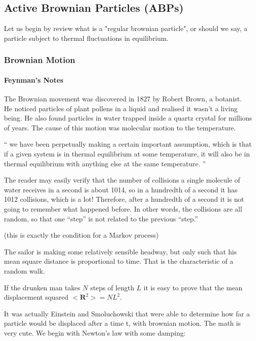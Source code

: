 \documentclass[a4paper]{article}
\begin{document}
\subsection{Active Brownian Particles (ABPs)}

Let us begin by review what is a "regular brownian particle", or should we say, a particle subject to thermal fluctuations in equilibrium.

\subsubsection{Brownian Motion}
\paragraph{Feynman's Notes} 

The Brownian movement was discovered in 1827 by Robert Brown, a botanist. He noticed particles of plant pollens in a liquid and realised it wasn't a living being. He also found particles in water trapped inside a quartz crystal for millions of years. The cause of this motion was molecular motion to the temperature.

``
we have been perpetually making a certain important assumption, which is that if a given system is in thermal equilibrium at some temperature, it will also be in thermal equilibrium with anything else at the same temperature.
''

 The reader may easily verify that the number of collisions a single molecule of water receives in a second is about 1014, so in a hundredth of a second it has 1012 collisions, which is a lot! Therefore, after a hundredth of a second it is not going to remember what happened before. In other words, the collisions are all random, so that one “step” is not related to the previous “step.”
 
 (this is exactly the condition for a Markov process)

The sailor is making some relatively sensible headway, but only such that his mean square distance is proportional to time. That is the characteristic of a random walk.
 
If the drunken man takes $N$ steps of length $L$ it is easy to prove that the mean displacement squared
$<\mathbf{R}^2> = NL^2$.

It was actually Einstein and Smoluchowski that were able to determine how far a particle would be displaced after a time t, with brownian motion. The math is very cute. We begin with Newton's law with some damping:
\end{document}
